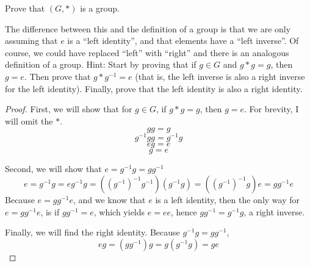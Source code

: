 \documentclass[a4paper]{article}
\begin{document}
\begin{myparindent}{0pt}
Prove that $(G, *)$ is a group. \newline

The difference between this and the definition of a group is that we are only
assuming that $e$ is a “left identity”, and that elements have a “left inverse”.
Of course, we could have replaced “left” with “right” and there is an analogous
definition of a group. Hint: Start by proving that if $g \in G$ and
$g * g = g$, then $g = e$. Then prove that $g * g^{-1} = e$ (that is, the left
inverse is also a right inverse for the left identity). Finally, prove that the
left identity is also a right identity. \newline

\begin{proof}
  First, we will show that for $g \in G$, if $g * g = g$, then $g = e$. For
  brevity, I will omit the $*$.
  \[ gg = g \]
  \[ g^{-1}gg = g^{-1} g \]
  \[ eg = e \]
  \[ g = e \]

  Second, we will show that $e = g^{-1}g = gg^{-1}$
  \[ e = g^{-1}g = eg^{-1}g = (({g^{-1}})^{-1}g^{-1}) (g^{-1}g) = (({g^{-1}})^{-1}g) e = gg^{-1}e \]
  Because $e = gg^{-1}e$, and we know that $e$ is a left identity, then the only
  way for $e = gg^{-1}e$, is if $gg^{-1} = e$, which yields $e = ee$, hence $gg^{-1} = g^{-1}g$,
  a right inverse. \newline

  Finally, we will find the right identity. Because $g^{-1}g = gg^{-1}$,
  \[ eg = (gg^{-1})g = g(g^{-1}g) = ge \]
\end{proof}

\end{myparindent}
\end{document}
